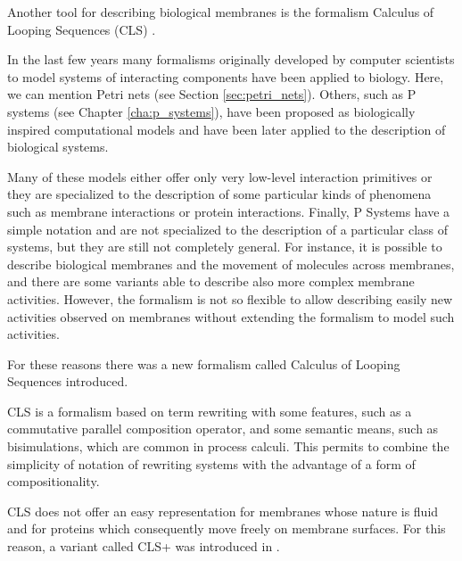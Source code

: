 Another tool for describing biological membranes is the formalism Calculus of Looping Sequences (CLS) \cite{Barbuti07CLS}.

In the last few years many formalisms originally developed by computer scientists to model systems of interacting components have been applied to biology. Here, we can mention Petri nets (see Section \ref{sec:petri_nets}). Others, such as P systems (see Chapter \ref{cha:p_systems}), have been proposed as biologically inspired computational models and have been later applied to the description of biological systems.

Many of these models either offer only very low-level interaction primitives or they are specialized to the description of some particular kinds of phenomena such as membrane interactions or protein interactions. Finally, P Systems have a simple notation and are not specialized to the description of a particular class of systems, but they are still not completely general. For instance, it is possible to describe biological membranes and the movement of molecules across membranes, and there are some variants able to describe also more complex membrane activities. However, the formalism is not so flexible to allow describing easily new activities observed on membranes without extending the formalism to model such activities.

For these reasons there was a new formalism called Calculus of Looping Sequences introduced.

CLS is a formalism based on term rewriting with some features, such as a commutative parallel composition operator, and some semantic means, such as bisimulations, which are common in process calculi. This permits to combine the simplicity of notation of rewriting systems with the advantage of a form of compositionality.

CLS does not offer an easy representation for membranes whose nature is fluid and for proteins which consequently move freely on membrane surfaces. For this reason, a variant called CLS+ was introduced in \cite{Milazzo07CLS}.